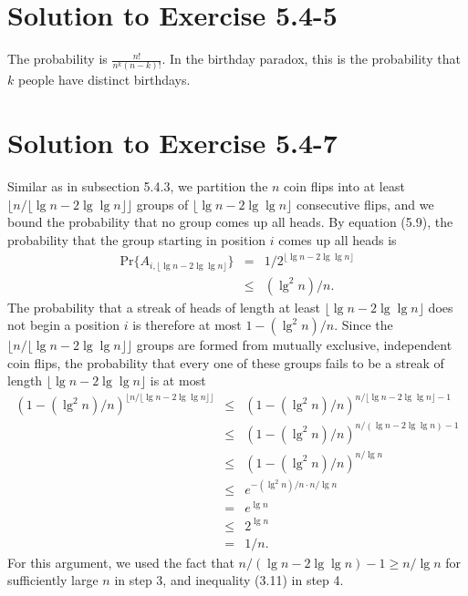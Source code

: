 \documentclass[a4paper, fleqn]{article}
\begin{document}
\section*{Solution to Exercise 5.4-5}

The probability is $\frac{n!}{n^k (n-k)!}$. In the birthday paradox, this is the 
probability that $k$ people have distinct birthdays.







\section*{Solution to Exercise 5.4-7}

Similar as in subsection 5.4.3, we partition the $n$ coin flips into at least 
$\lfloor n / \lfloor \lg n - 2\lg\lg n \rfloor \rfloor$ groups of $\lfloor 
\lg n - 2\lg\lg n \rfloor$ consecutive flips, and we bound the probability that 
no group comes up all heads. By equation (5.9), the probability that the group 
starting in position $i$ comes up all heads is
\begin{eqnarray*}
\mbox{Pr}\{A_{i,\lfloor \lg n - 2\lg\lg n \rfloor}\} & = & 1 / 2^{\lfloor \lg n - 2\lg\lg n \rfloor} \\
& \leq & (\lg^2 n) / n.
\end{eqnarray*}
The probability that a streak of heads of length at least $\lfloor \lg n - 
2\lg\lg n \rfloor$ does not begin a position $i$ is therefore at most $1 - 
(\lg^2 n) / n$. Since the $\lfloor n / \lfloor \lg n - 2\lg\lg n \rfloor 
\rfloor$ groups are formed from mutually exclusive, independent coin flips, 
the probability that every one of these groups fails to be a streak of length 
$\lfloor \lg n - 2\lg\lg n \rfloor$ is at most
\begin{eqnarray*}
(1 - (\lg^2 n) / n)^{\lfloor n / \lfloor \lg n - 2\lg\lg n \rfloor \rfloor} & \leq &
(1 - (\lg^2 n) / n)^{n / \lfloor \lg n - 2\lg\lg n \rfloor - 1} \\
& \leq & (1 - (\lg^2 n) / n)^{n / (\lg n - 2\lg\lg n) - 1} \\
& \leq & (1 - (\lg^2 n) / n)^{n / \lg n} \\
& \leq & e^{-(\lg^2 n) / n \cdot n / \lg n} \\
&   =  & e^{\lg n} \\
& \leq & 2^{\lg n} \\
&   =  & 1 / n.
\end{eqnarray*}
For this argument, we used the fact that $n / (\lg n - 2\lg\lg n ) - 1 \geq n 
/ \lg n$ for sufficiently large $n$ in step 3, and inequality (3.11) in step 4.
\end{document}
